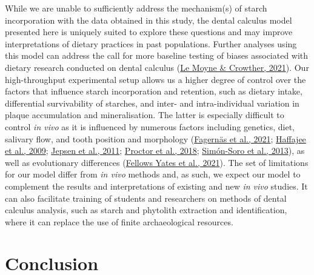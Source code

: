 \documentclass[
  letterpaper,
]{book}
\begin{document}
While we are unable to sufficiently address the mechanism(s) of starch
incorporation with the data obtained in this study, the dental calculus
model presented here is uniquely suited to explore these questions and
may improve interpretations of dietary practices in past populations.
Further analyses using this model can address the call for more baseline
testing of biases associated with dietary research conducted on dental
calculus (\protect\hyperlink{ref-lemoyneCalculusPretreatments2021}{Le
Moyne \& Crowther, 2021}). Our high-throughput experimental setup allows
us a higher degree of control over the factors that influence starch
incorporation and retention, such as dietary intake, differential
survivability of starches, and inter- and intra-individual variation in
plaque accumulation and mineralisation. The latter is especially
difficult to control \emph{in vivo} as it is influenced by numerous
factors including genetics, diet, salivary flow, and tooth position and
morphology
(\protect\hyperlink{ref-fagernasMicrobialBiogeography2021}{Fagernäs et
al., 2021}; \protect\hyperlink{ref-haffajeeBiofilmPosition2009}{Haffajee
et al., 2009}; \protect\hyperlink{ref-jepsenCalculusRemoval2011}{Jepsen
et al., 2011};
\protect\hyperlink{ref-proctorSpatialGradient2018}{Proctor et al.,
2018}; \protect\hyperlink{ref-simonsoroOralGeography2013}{Simón-Soro et
al., 2013}), as well as evolutionary differences
(\protect\hyperlink{ref-yatesOralMicrobiome2021}{Fellows Yates et al.,
2021}). The set of limitations for our model differ from \emph{in vivo}
methods and, as such, we expect our model to complement the results and
interpretations of existing and new \emph{in vivo} studies. It can also
facilitate training of students and researchers on methods of dental
calculus analysis, such as starch and phytolith extraction and
identification, where it can replace the use of finite archaeological
resources.

\hypertarget{conclusion}{%
\section{Conclusion}\label{conclusion}}
\end{document}
